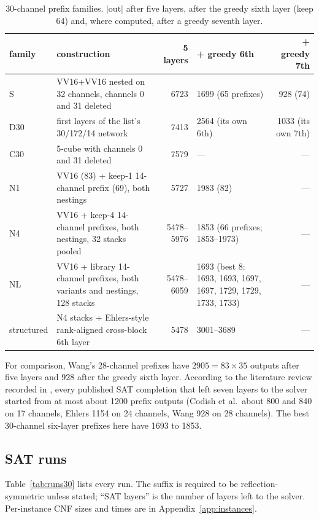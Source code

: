 \documentclass[11pt,a4paper]{article}
\theoremstyle{plain}
\theoremstyle{definition}
\theoremstyle{remark}
\newcommand{\out}{\mathrm{out}}
\begin{document}
\begin{table}[ht]
\centering\small
\caption{30-channel prefix families. $|\out|$ after five layers, after the greedy sixth layer (keep 64) and, where computed, after a greedy seventh layer.}
\label{tab:fam30}
\begin{tabularx}{\textwidth}{@{}lLrLr@{}}
\toprule
family & construction & 5 layers & + greedy 6th & + greedy 7th \\
\midrule
S & VV16+VV16 nested on 32 channels, channels 0 and 31 deleted & 6723 & 1699 (65 prefixes) & 928 (74) \\
D30 & first layers of the list's 30/172/14 network & 7413 & 2564 (its own 6th) & 1033 (its own 7th) \\
C30 & 5-cube with channels 0 and 31 deleted & 7579 & --- & --- \\
N1 & VV16 (83) + keep-1 14-channel prefix (69), both nestings & 5727 & 1983 (82) & --- \\
N4 & VV16 + keep-4 14-channel prefixes, both nestings, 32 stacks pooled & 5478--5976 & 1853 (66 prefixes; 1853--1973) & --- \\
NL & VV16 + library 14-channel prefixes, both variants and nestings, 128 stacks & 5478--6059 & 1693 (best 8: 1693, 1693, 1697, 1697, 1729, 1729, 1733, 1733) & --- \\
structured & N4 stacks + Ehlers-style rank-aligned cross-block 6th layer & 5478 & 3001--3689 & --- \\
\bottomrule
\end{tabularx}
\end{table}

For comparison, Wang's 28-channel prefixes have $2905=83\times 35$ outputs after five layers and 928 after the greedy sixth layer. According to the literature review recorded in , every published SAT completion that left seven layers to the solver started from at most about 1200 prefix outputs (Codish et al.\ about 800 and 840 on 17 channels, Ehlers 1154 on 24 channels, Wang 928 on 28 channels). The best 30-channel six-layer prefixes here have 1693 to 1853.

\subsection{SAT runs}\label{sec:runs30}

Table~\ref{tab:runs30} lists every run. The suffix is required to be reflection-symmetric unless stated; ``SAT layers'' is the number of layers left to the solver. Per-instance CNF sizes and times are in Appendix~\ref{app:instances}.
\end{document}
